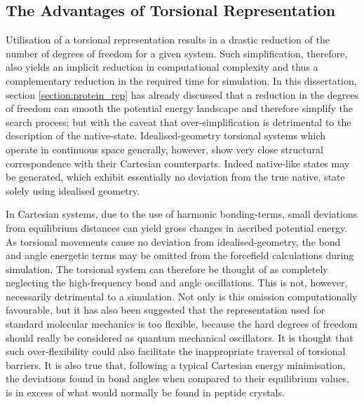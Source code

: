 \subsection{The Advantages of Torsional Representation}

Utilisation of a torsional representation results in a drastic reduction of the number of degrees of freedom for a given system. Such simplification, therefore, also yields an implicit reduction in computational complexity and thus a complementary reduction in the required time for simulation. In this dissertation, section \ref{section:protein_rep} has already discussed that a reduction in the degrees of freedom can smooth the potential energy landscape and therefore simplify the search process; but with the caveat that over-simplification is detrimental to the description of the native-state.
Idealised-geometry torsional systems which operate in continuous space generally, however, show very close structural correspondence with their Cartesian counterparts. Indeed native-like states may be generated, which exhibit essentially no deviation from the true native, state solely using idealised geometry.

In Cartesian systems, due to the use of harmonic bonding-terms, small deviations from equilibrium distances  can yield gross changes in ascribed potential energy. As torsional movements cause no deviation from idealised-geometry, the bond and angle energetic terms may be omitted from the forcefield calculations during simulation. 
The torsional system can therefore be thought of as completely neglecting the high-frequency bond and angle oscillations. This is not, however, necessarily detrimental to a simulation. Not only is this omission computationally favourable, but it has also been suggested that the representation
used for standard molecular mechanics is too flexible, because the hard degrees of freedom should really be considered as quantum mechanical oscillators\cite{NATIVE:InternalVibrations}. It is thought that such over-flexibility could also facilitate the inappropriate traversal of torsional barriers. It is also true that, following a typical Cartesian energy minimisation, the deviations found in bond angles when compared to their equilibrium values, is in excess of what would normally be found in peptide crystals\cite{SIMULATION:Gibson90}.


